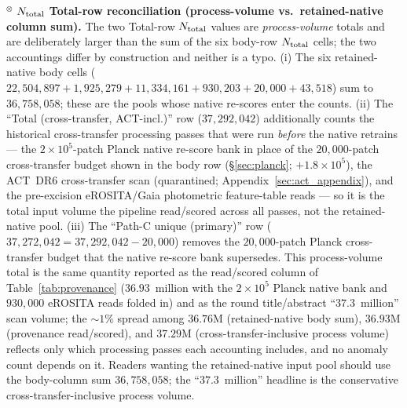 \documentclass[aps,prd,twocolumn,superscriptaddress,showpacs,preprintnumbers,nofootinbib,longbibliography,floatfix]{revtex4-2}
\begin{document}
{$^{\otimes}$ \textbf{$N_{\rm total}$ Total-row reconciliation (process-volume vs.\ retained-native column sum).} The two Total-row $N_{\rm total}$ values are \emph{process-volume} totals and are deliberately larger than the sum of the six body-row $N_{\rm total}$ cells; the two accountings differ by construction and neither is a typo. (i) The six retained-native body cells ($22{,}504{,}897 + 1{,}925{,}279 + 11{,}334{,}161 + 930{,}203 + 20{,}000 + 43{,}518$) sum to $36{,}758{,}058$; these are the pools whose native re-scores enter the counts. (ii) The ``Total (cross-transfer, ACT-incl.)'' row ($37{,}292{,}042$) additionally counts the historical cross-transfer processing passes that were run \emph{before} the native retrains --- the $2\times10^{5}$-patch Planck native re-score bank in place of the $20{,}000$-patch cross-transfer budget shown in the body row (\S\ref{sec:planck}; $+1.8\times10^{5}$), the ACT~DR6 cross-transfer scan (quarantined; Appendix~\ref{sec:act_appendix}), and the pre-excision eROSITA/Gaia photometric feature-table reads --- so it is the total input volume the pipeline read/scored across all passes, not the retained-native pool. (iii) The ``Path-C unique (primary)'' row ($37{,}272{,}042 = 37{,}292{,}042 - 20{,}000$) removes the $20{,}000$-patch Planck cross-transfer budget that the native re-score bank supersedes. This process-volume total is the same quantity reported as the read/scored column of Table~\ref{tab:provenance} ($36.93$~million with the $2\times10^{5}$ Planck native bank and $930{,}000$ eROSITA reads folded in) and as the round title/abstract ``$37.3$~million'' scan volume; the ${\sim}1\%$ spread among $36.76$M (retained-native body sum), $36.93$M (provenance read/scored), and $37.29$M (cross-transfer-inclusive process volume) reflects only which processing passes each accounting includes, and no anomaly count depends on it. Readers wanting the retained-native input pool should use the body-column sum $36{,}758{,}058$; the ``$37.3$~million'' headline is the conservative cross-transfer-inclusive process volume.\\
}
\end{document}
